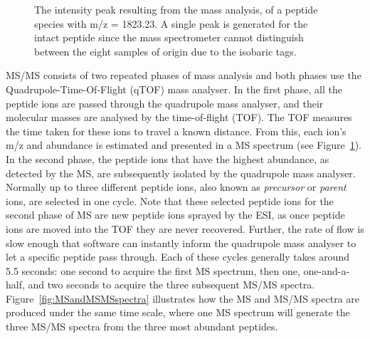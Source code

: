 \begin{figure}[!htb]
\caption{The intensity peak resulting from the mass analysis, of a peptide species with m/z = 1823.23. A single peak is generated for the intact peptide since the mass spectrometer cannot distinguish between the eight samples of origin due to the isobaric tags.}
\label{fig:MS}
\end{figure}

MS/MS consists of two repeated phases of mass analysis and both phases use the Quadrupole-Time-Of-Flight (qTOF) mass analyser. In the first phase, all the peptide ions are passed through the quadrupole mass analyser, and their molecular masses are analysed by the time-of-flight (TOF). The TOF measures the time taken for these ions to travel a known distance. From this, each ion's m/z and abundance is estimated and presented in a MS spectrum (see Figure~\ref{fig:MS}). In the second phase, the peptide ions that have the highest abundance, as detected by the MS, are subsequently isolated by the quadrupole mass analyser. Normally up to three different peptide ions, also known as \emph{precursor} or \emph{parent} ions, are selected in one cycle. Note that these selected peptide ions for the second phase of MS are new peptide ions sprayed by the ESI, as once peptide ions are moved into the TOF they are never recovered. Further, the rate of flow is slow enough that software can instantly inform the quadrupole mass analyser to let a specific peptide pass through. Each of these cycles generally takes around 5.5 seconds: one second to acquire the first MS spectrum, then one, one-and-a-half, and two seconds to acquire the three subsequent MS/MS spectra. Figure~\ref{fig:MSandMSMSspectra} illustrates how the MS and MS/MS spectra are produced under the same time scale, where one MS spectrum will generate the three MS/MS spectra from the three most abundant peptides. 

